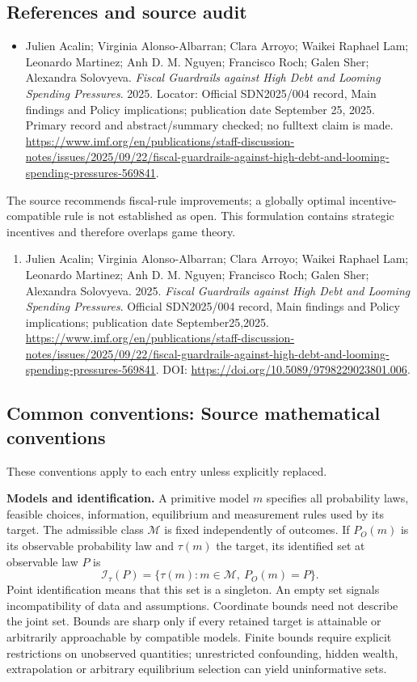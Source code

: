 \documentclass[11pt,a4paper]{article}
\begin{document}
\subsection*{References and source audit}
\begin{itemize}
\item Julien Acalin; Virginia Alonso-Albarran; Clara Arroyo; Waikei Raphael Lam; Leonardo Martinez; Anh D. M. Nguyen; Francisco Roch; Galen Sher; Alexandra Solovyeva. \emph{Fiscal Guardrails against High Debt and Looming Spending Pressures}. 2025. Locator: Official SDN2025/004 record, Main findings and Policy implications; publication date September 25, 2025. Primary record and abstract/summary checked; no fulltext claim is made. \url{https://www.imf.org/en/publications/staff-discussion-notes/issues/2025/09/22/fiscal-guardrails-against-high-debt-and-looming-spending-pressures-569841}.
\end{itemize}
The source recommends fiscal-rule improvements; a globally optimal incentive-compatible rule is not established as open. This formulation contains strategic incentives and therefore overlaps game theory.
\begin{enumerate}\raggedright
\item\hypertarget{definitions:source:30007540:1}{} Julien Acalin; Virginia Alonso-Albarran; Clara Arroyo; Waikei Raphael Lam; Leonardo Martinez; Anh D. M. Nguyen; Francisco Roch; Galen Sher; Alexandra Solovyeva. 2025. \emph{Fiscal Guardrails against High Debt and Looming Spending Pressures}. Official SDN2025/004 record, Main findings and Policy implications; publication date September25,2025.
\url{https://www.imf.org/en/publications/staff-discussion-notes/issues/2025/09/22/fiscal-guardrails-against-high-debt-and-looming-spending-pressures-569841}.
DOI: \url{https://doi.org/10.5089/9798229023801.006}.
\end{enumerate}

\subsection*{Common conventions: Source mathematical conventions}

These conventions apply to each entry unless explicitly replaced.

\textbf{Models and identification.} A primitive model \(m\) specifies all probability laws, feasible choices, information, equilibrium and measurement rules used by its target. The admissible class \(\mathcal M\) is fixed independently of outcomes. If \(P_O(m)\) is its observable probability law and \(\tau(m)\) the target, its identified set at observable law \(P\) is
\[
 \mathcal I_\tau(P)=\{\tau(m):m\in\mathcal M,\ P_O(m)=P\}.
\]
Point identification means that this set is a singleton. An empty set signals incompatibility of data and assumptions. Coordinate bounds need not describe the joint set. Bounds are sharp only if every retained target is attainable or arbitrarily approachable by compatible models. Finite bounds require explicit restrictions on unobserved quantities; unrestricted confounding, hidden wealth, extrapolation or arbitrary equilibrium selection can yield uninformative sets.
\end{document}
